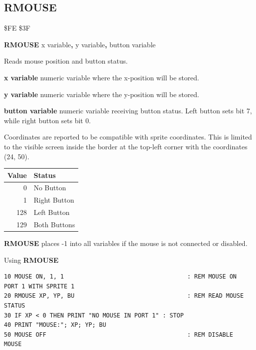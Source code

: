 \subsection{RMOUSE}
\begin{description}[leftmargin=2cm,style=nextline]
\item [Token:]    \$FE \$3F

\item [Format:]   {\bf RMOUSE} x variable{\bf,} y variable{\bf,} button variable

\item [Usage:]    Reads mouse position and button status.

                  {\bf x variable} numeric variable where the x-position will be stored.

                  {\bf y variable} numeric variable where the y-position will be stored.

                  {\bf button variable} numeric variable receiving button status. Left button sets bit 7, while right button sets bit 0.

                  Coordinates are reported to be compatible with sprite coordinates. This is limited to the visible screen inside the border at the top-left corner with the coordinates (24, 50).

                  \begin{center}
                  {\setlength{\tabcolsep}{1mm}
                  \begin{tabular}{|r|l|}
                  \hline
                  {\bf Value} & {\bf Status} \\
                  \hline
                  0   & No Button \\
                  1   & Right Button \\
                  128 & Left Button \\
                  129 & Both Buttons \\
                  \hline
                  \end{tabular}
                  }
                  \end{center}

\item [Remarks:]  {\bf RMOUSE} places -1 into all variables if the mouse is not connected or disabled.

\item [Example:]  Using {\bf RMOUSE}

\begin{tcolorbox}[colback=black,coltext=white]
\verbatimfont{\codefont}
\begin{verbatim}
10 MOUSE ON, 1, 1                                   : REM MOUSE ON PORT 1 WITH SPRITE 1
20 RMOUSE XP, YP, BU                                : REM READ MOUSE STATUS
30 IF XP < 0 THEN PRINT "NO MOUSE IN PORT 1" : STOP
40 PRINT "MOUSE:"; XP; YP; BU
50 MOUSE OFF                                        : REM DISABLE MOUSE
\end{verbatim}
\end{tcolorbox}
\end{description}

